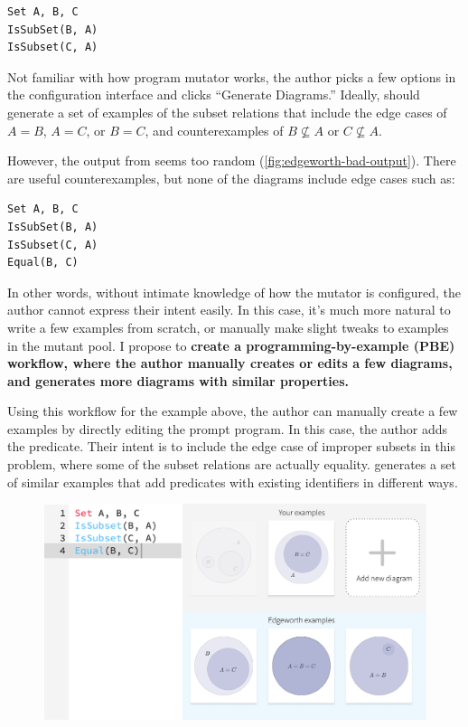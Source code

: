 \begin{verbatim}
Set A, B, C
IsSubSet(B, A)
IsSubset(C, A)
\end{verbatim}

Not familiar with how program mutator works, the author picks a few options in the configuration interface and clicks ``Generate Diagrams.'' Ideally, \Edgeworth should generate a set of examples of the subset relations that include the edge cases of $A = B$, $A = C$, or $B = C$, and counterexamples of $B \not\subseteq A$ or $C \not\subseteq A$. 

However, the output from \Edgeworth seems too random (\cref{fig:edgeworth-bad-output}). There are useful counterexamples, but none of the diagrams include edge cases such as:
\begin{verbatim}
Set A, B, C
IsSubSet(B, A)
IsSubset(C, A)
Equal(B, C)
\end{verbatim}

In other words, without intimate knowledge of how the \Edgeworth mutator is configured, the author cannot express their intent easily. In this case, it's much more natural to write a few examples from scratch, or manually make slight tweaks to examples in the mutant pool. I propose to \textbf{create a programming-by-example (PBE) workflow, where the author manually creates or edits a few diagrams, and \Edgeworth generates more diagrams with similar properties.}

Using this workflow for the example above, the author can manually create a few examples by directly editing the prompt program. In this case, the author adds the  predicate. Their intent is to include the edge case of improper subsets in this problem, where some of the subset relations are actually equality. \Edgeworth generates a set of similar examples that add  predicates with existing identifiers in different ways. 

\vspace{10pt}
\begin{figure}[h]
    \centering
    \includegraphics[width=0.8\linewidth]{assets/appendix/synthesis-driven-workflow.pdf}
\end{figure}
\vspace{10pt}

